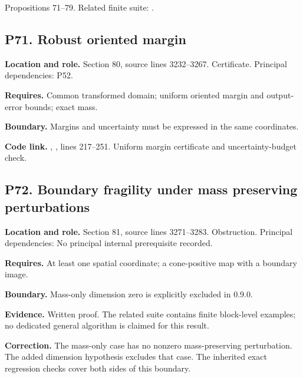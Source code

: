 \documentclass[11pt,letterpaper]{article}
\begin{document}
Propositions 71--79. Related finite suite:
.

\par\noindent\begin{minipage}{\textwidth}
\subsection{P71. Robust oriented
margin}\label{p71.-robust-oriented-margin}

\textbf{Location and role.} Section 80, source lines 3232--3267.
Certificate. Principal dependencies: P52.

\textbf{Requires.} Common transformed domain; uniform oriented margin
and output-error bounds; exact mass.

\textbf{Boundary.} Margins and uncertainty must be expressed in the same
coordinates.

\textbf{Code link.} ,
, lines 217--251. Uniform margin certificate
and uncertainty-budget check.
\end{minipage}\par\medskip

\par\noindent\begin{minipage}{\textwidth}
\subsection{P72. Boundary fragility under mass preserving
perturbations}\label{p72.-boundary-fragility-under-mass-preserving-perturbations}

\textbf{Location and role.} Section 81, source lines 3271--3283.
Obstruction. Principal dependencies: No principal internal prerequisite
recorded.

\textbf{Requires.} At least one spatial coordinate; a cone-positive map
with a boundary image.

\textbf{Boundary.} Mass-only dimension zero is explicitly excluded in
0.9.0.

\textbf{Evidence.} Written proof. The related suite contains finite
block-level examples; no dedicated general algorithm is claimed for this
result.

\textbf{Correction.} The mass-only case has no nonzero mass-preserving
perturbation. The added dimension hypothesis excludes that case. The
inherited exact regression checks cover both sides of this boundary.
\end{minipage}\par\medskip
\end{document}
